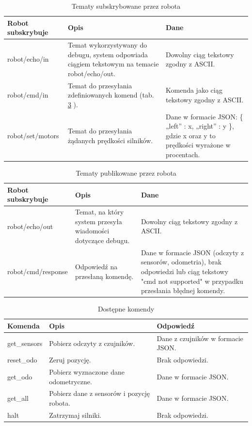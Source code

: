 \documentclass[12pt,twoside]{article}
\begin{document}
\begin{table}[ht]
\caption{Tematy subskrybowane przez robota}
\centering		
	\begin{tabular}{|p{}|p{}|p{}|}	
		\hline
		Robot subskrybuje & Opis & Dane \\
		\hline
		robot/echo/in & Temat wykorzystywany do debugu, system odpowiada ciągiem tekstowym na temacie robot/echo/out. & Dowolny ciąg tekstowy zgodny z ASCII. \\
		\hline
		robot/cmd/in & Temat do przesyłania zdefiniowanych komend (tab. \ref{Tab:RobotCMD} ). & Komenda jako ciąg tekstowy zgodny z ASCII. \\
		\hline
		robot/set/motors & Temat do przesyłania żądanych prędkości silników. & Dane w formacie JSON: \{ „left” : x, „right” : y \}, gdzie x oraz y to prędkości wyrażone w procentach. \\
		\hline
	\end{tabular}	
	
\label{Tab:RobotSub}
\end{table}	

\begin{table}[ht]
\caption{Tematy publikowane przez robota}
\centering		
	\begin{tabular}{|p{}|p{}|p{}|}	
		\hline
		Robot subskrybuje & Opis & Dane \\
		\hline
		robot/echo/out & Temat, na który system przesyła wiadomości dotyczące debugu. & Dowolny ciąg tekstowy zgodny z ASCII. \\
		\hline
		robot/cmd/response & Odpowiedź na przesłaną komendę. & Dane w formacie JSON (odczyty z sensorów, odometria), brak odpowiedzi lub ciąg tekstowy "cmd not supported" w przypadku przesłania błędnej komendy. \\
		\hline
	\end{tabular}	
	
\label{Tab:RobotPub}
\end{table}	

\begin{table}[ht]
\caption{Dostępne komendy}
\centering		
	\begin{tabular}{|p{}|p{}|p{}|}	
		\hline
		Komenda & Opis & Odpowiedź \\
		\hline
		get\_sensors & Pobierz odczyty z czujników. & Dane z czujników w formacie JSON. \\
		\hline
		reset\_odo & Zeruj pozycję. & Brak odpowiedzi. \\
		\hline
		get\_odo & Pobierz wyznaczone dane odometryczne. & Dane w formacie JSON. \\
		\hline
		get\_all & Pobierz dane z sensorów i pozycję robota. & Dane w formacie JSON. \\
		\hline
		halt & Zatrzymaj silniki. & Brak odpowiedzi. \\
		\hline
	\end{tabular}	
	
\label{Tab:RobotCMD}
\end{table}	
\end{document}

